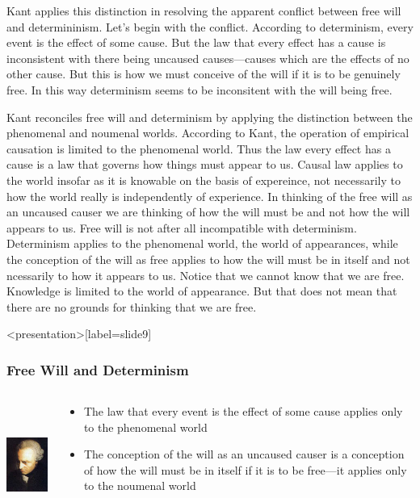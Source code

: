 Kant applies this distinction in resolving the apparent conflict between free will and determininism. 
Let’s begin with the conflict. According to determinism, every event is the effect of some cause. But the law that every effect has a cause is inconsistent with there being uncaused causes---causes which are the effects of no other cause. But this is how we must conceive of the will if it is to be genuinely free. In this way determinism seems to be inconsitent with the will being free.

Kant reconciles free will and determinism by applying the distinction between the phenomenal and noumenal worlds. According to Kant, the operation of empirical causation is limited to the phenomenal world. Thus the law every effect has a cause is a law that governs how things must appear to us. Causal law applies to the world insofar as it is knowable on the basis of expereince, not necessarily to how the world really is independently of experience. In thinking of the free will as an uncaused causer we are thinking of how the will must be and not how the will appears to us. Free will is not after all incompatible with determinism. Determinism applies to the phenomenal world, the world of appearances, while the conception of the will as free applies to how the will must be in itself and not ncessarily to how it appears to us.
Notice that we cannot know that we are free. Knowledge is limited to the world of appearance. But that does not mean that there are no grounds for thinking that we are free. \change

\begin{frame}<presentation>[label=slide9]
    \frametitle{Free Will and Determinism}
        \begin{columns}
            \begin{column}{3cm}
                \includegraphics[height=4cm]{../../graphics/kant.jpg}
            \end{column}
            \begin{column}{7cm}
                \begin{itemize}
                    \item The law that every event is the effect of some cause applies only to the phenomenal world
                    \item The conception of the will as an uncaused causer is a conception of how the will must be in itself if it is to be free---it applies only to the noumenal world
                \end{itemize}
            \end{column}
        \end{columns}
\end{frame}

